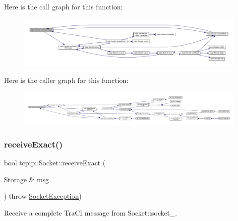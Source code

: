 Here is the call graph for this function\+:
\nopagebreak
\begin{figure}[H]
\begin{center}
\leavevmode
\includegraphics[width=350pt]{classtcpip_1_1_socket_ac752adee7260dc7e7778f639febc0cf1_cgraph}
\end{center}
\end{figure}
Here is the caller graph for this function\+:
\nopagebreak
\begin{figure}[H]
\begin{center}
\leavevmode
\includegraphics[width=350pt]{classtcpip_1_1_socket_ac752adee7260dc7e7778f639febc0cf1_icgraph}
\end{center}
\end{figure}
\mbox{\label{classtcpip_1_1_socket_a0d00337ac1fbad2cf183f0a651539e2e}} 
\subsubsection{\texorpdfstring{receive\+Exact()}{receiveExact()}}
{\footnotesize\ttfamily bool tcpip\+::\+Socket\+::receive\+Exact (\begin{DoxyParamCaption}\item[{\hyperlink{classtcpip_1_1_storage}{Storage} \&}]{msg }\end{DoxyParamCaption}) throw  \hyperlink{classtcpip_1_1_socket_exception}{Socket\+Exception}) }



Receive a complete Tra\+CI message from Socket\+::socket\+\_\+. 

